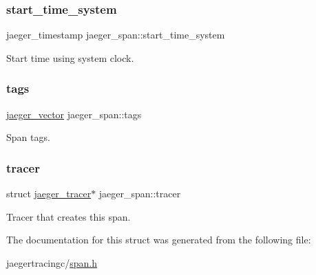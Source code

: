 \subsubsection{\texorpdfstring{start\+\_\+time\+\_\+system}{start\_time\_system}}
{\footnotesize\ttfamily jaeger\+\_\+timestamp jaeger\+\_\+span\+::start\+\_\+time\+\_\+system}



Start time using system clock. 

\mbox{\label{structjaeger__span_ae3812e107e701876ca824427ebdddbde}} 
\subsubsection{\texorpdfstring{tags}{tags}}
{\footnotesize\ttfamily \mbox{\hyperlink{structjaeger__vector}{jaeger\+\_\+vector}} jaeger\+\_\+span\+::tags}



Span tags. 

\mbox{\label{structjaeger__span_a7cff74ecb3637cba8038d0d600d4acff}} 
\subsubsection{\texorpdfstring{tracer}{tracer}}
{\footnotesize\ttfamily struct \mbox{\hyperlink{structjaeger__tracer}{jaeger\+\_\+tracer}}$\ast$ jaeger\+\_\+span\+::tracer}



Tracer that creates this span. 



The documentation for this struct was generated from the following file\+:\begin{DoxyCompactItemize}
\item 
jaegertracingc/\mbox{\hyperlink{span_8h}{span.\+h}}\end{DoxyCompactItemize}
